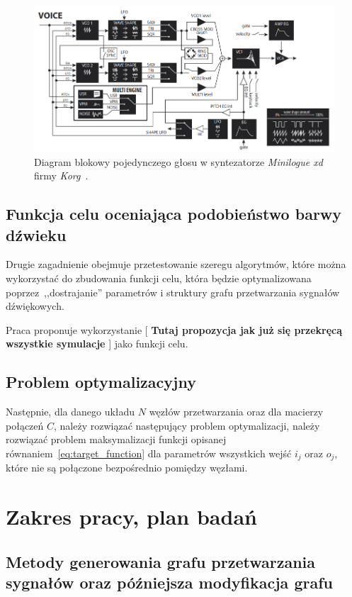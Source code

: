 \begin{figure}[H]
    \centering
    \includegraphics[width=0.8\linewidth]{rys01/minilogue_voice_block_diagram.png}
    \caption{
      Diagram blokowy pojedynczego głosu w syntezatorze 
      \textit{Minilogue xd} firmy \textit{Korg}~\cite{minilogue_diagram}.
    }\label{fig:minilogue_diagram}
\end{figure}

\subsection{Funkcja celu oceniająca podobieństwo barwy dźwieku}

Drugie zagadnienie obejmuje przetestowanie szeregu algorytmów, które można
wykorzystać do zbudowania funkcji celu, która będzie optymalizowana
poprzez~,,dostrajanie'' parametrów i struktury grafu przetwarzania sygnałów dźwiękowych.

Praca proponuje wykorzystanie [
  \textbf{Tutaj propozycja jak już się przekręcą wszystkie symulacje}
] jako funkcji celu.

\subsection{Problem optymalizacyjny}

Następnie, dla danego układu $N$ węzłów przetwarzania oraz dla macierzy połączeń $C$, 
należy rozwiązać następujący problem optymalizacji, należy rozwiązać problem
maksymalizacji funkcji opisanej równaniem~\ref{eq:target_function} dla
parametrów wszystkich wejść $i_j$ oraz $o_j$, które nie są połączone bezpośrednio
pomiędzy węzłami.




\section{Zakres pracy, plan badań}

\subsection{Metody generowania grafu przetwarzania sygnałów oraz późniejsza modyfikacja grafu}

